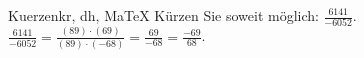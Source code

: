 \begin{MAufgabe}{Kuerzen}{kr, dh, MaTeX}
K\"urzen Sie soweit m\"oglich: $\frac{6141}{-6052}$.\\ 
\ifLsg\MLoesung
\quad $\frac{6141}{-6052}=\frac{(89)\cdot(69)}{(89)\cdot(-68)}=\frac{69}{-68}=\frac{-69}{68}$.\else\relax\fi
 \end{MAufgabe}